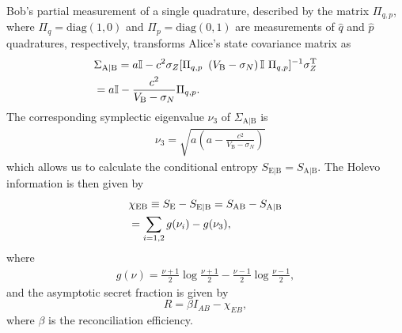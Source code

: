 \documentclass[%
reprint,
superscriptaddress,
 amsmath,amssymb,amsfonts,
 aps,
 pra,
 longbibliography
]{revtex4-2}
\newcommand{\ind}[1]{\mathrm{#1}}
\begin{document}
Bob’s partial measurement of a single quadrature, described by the matrix $\Pi_{q,p}$, where $\Pi_q=\ind{diag}(1,0)$ and $\Pi_p=\ind{diag}(0,1)$ are measurements of $\hat{q}$ and $\hat{p}$ quadratures, respectively, transforms Alice's state covariance matrix as~\cite{laudenbach2018continuous}
\begin{align}
    \label{eq:AB}
    &\Sigma_{\ind{A}|\ind{B}}=a\mathbb{I}-c^2\sigma_Z[\Pi_{q,p}\ \left(V_{\ind{B}}-\sigma_N\right)\mathbb{I}\ \Pi_{q,p}]^{-1}\sigma_Z^{\ind T}\notag\\
    &=a\mathbb{I}-\frac{c^2}{V_{\ind{B}}-\sigma_N}\Pi_{q,p}.
\end{align}
The corresponding symplectic eigenvalue $\nu_3$ of $\Sigma_{\ind{A}|\ind{B}}$ is
 \begin{align}
     \label{eq:nu3}
     &\nu_3=\sqrt{a\left(a-\frac{c^2}{V_{\ind{B}}-\sigma_N}\right)}
 \end{align}
which allows us to calculate the conditional entropy $S_{\ind{E}|\ind{B}}=S_{\ind{A}|\ind{B}}$. The Holevo information is then given by
\begin{align}
\label{eq:chi}
    &\chi_{\ind{EB}}\equiv S_{\ind{E}}-S_{\ind{E}|\ind{B}}=S_{\ind{AB}}-S_{\ind{A}|\ind{B}}\notag\\&=\sum_{i=1,2}g(\nu_i)-g(\nu_3),
\end{align}
where
\begin{align}
\label{eq:g(nu)}
    g(\nu)=\frac{\nu+1}{2}\log \frac{\nu+1}{2}-
    \frac{\nu-1}{2}\log\frac{\nu-1}{2},
\end{align}
and the asymptotic secret fraction is given by
\begin{equation}
\label{eq:r}
    R=\beta I_{AB}-\chi_{EB},
\end{equation}
where $\beta$ is the reconciliation efficiency.
\end{document}

